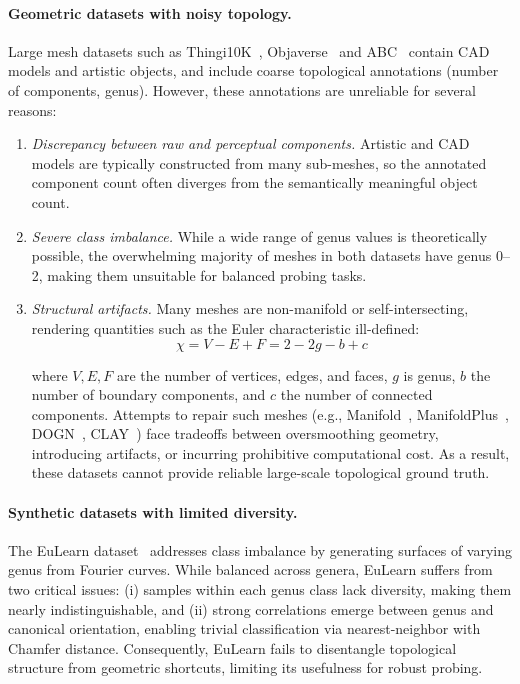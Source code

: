 \paragraph{Geometric datasets with noisy topology.}
Large mesh datasets such as Thingi10K~\cite{thingi}, Objaverse~\cite{objaverse} and ABC~\cite{abc} contain CAD models and artistic objects, and include coarse topological annotations (number of components, genus). However, these annotations are unreliable for several reasons:

\begin{enumerate}
  \item \textit{Discrepancy between raw and perceptual components.} Artistic and CAD models are typically constructed from many sub-meshes, so the annotated component count often diverges from the semantically meaningful object count.
  \item \textit{Severe class imbalance.} While a wide range of genus values is theoretically possible, the overwhelming majority of meshes in both datasets have genus 0–2, making them unsuitable for balanced probing tasks.
  \item \textit{Structural artifacts.} Many meshes are non-manifold or self-intersecting, rendering quantities such as the Euler characteristic ill-defined:
\begin{equation}
  \chi = V - E + F = 2 - 2g - b + c
  \label{eq:euler}
\end{equation}

where $V,E,F$ are the number of vertices, edges, and faces, $g$ is genus, $b$ the number of boundary components, and $c$ the number of connected components.
Attempts to repair such meshes (e.g., Manifold~\cite{manifold}, ManifoldPlus~\cite{manifoldplus}, DOGN~\cite{dogn}, CLAY~\cite{clay}) face tradeoffs between oversmoothing geometry, introducing artifacts, or incurring prohibitive computational cost. As a result, these datasets cannot provide reliable large-scale topological ground truth.
\end{enumerate}

\paragraph{Synthetic datasets with limited diversity.} 
The EuLearn dataset~\cite{eulearn} addresses class imbalance by generating surfaces of varying genus from Fourier curves. While balanced across genera, EuLearn suffers from two critical issues: (i) samples within each genus class lack diversity, making them nearly indistinguishable, and (ii) strong correlations emerge between genus and canonical orientation, enabling trivial classification via nearest-neighbor with Chamfer distance. Consequently, EuLearn fails to disentangle topological structure from geometric shortcuts, limiting its usefulness for robust probing.

